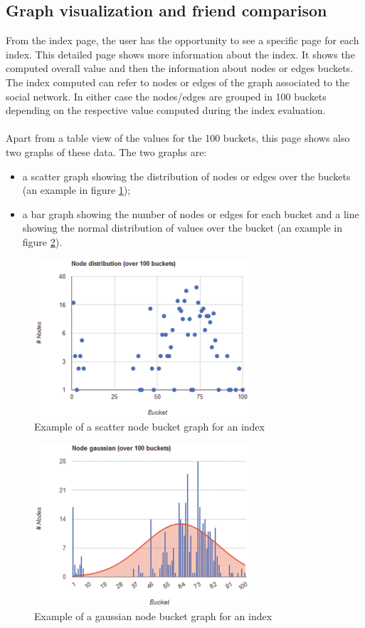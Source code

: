 \subsection{Graph visualization and friend comparison}
From the index page, the user has the opportunity to see a specific page for each index.
This detailed page shows more information about the index.
It shows the computed overall value and then the information about nodes or edges buckets.
The index computed can refer to nodes or edges of the graph associated to the social network.
In either case the nodes/edges are grouped in 100 buckets depending on the respective value computed during the index evaluation.\\
\\
Apart from a table view of the values for the 100 buckets, this page shows also two graphs of these data.
The two graphs are:
\begin{itemize}
\item a scatter graph showing the distribution of nodes or edges over the buckets (an example in figure \ref{fig:scatter});
\item a bar graph showing the number of nodes or edges for each bucket and a line showing the normal distribution of values over the bucket
(an example in figure \ref{fig:gaussian}).
\end{itemize}

\begin{figure}[h]
\centering
\includegraphics[width=8cm]{Fig6scatter.eps}
\caption{Example of a scatter node bucket graph for an index}
\label{fig:scatter}
\end{figure}

\begin{figure}[h]
\centering
\includegraphics[width=8cm]{Fig7gaussian.eps}
\caption{Example of a gaussian node bucket graph for an index}
\label{fig:gaussian}
\end{figure}

